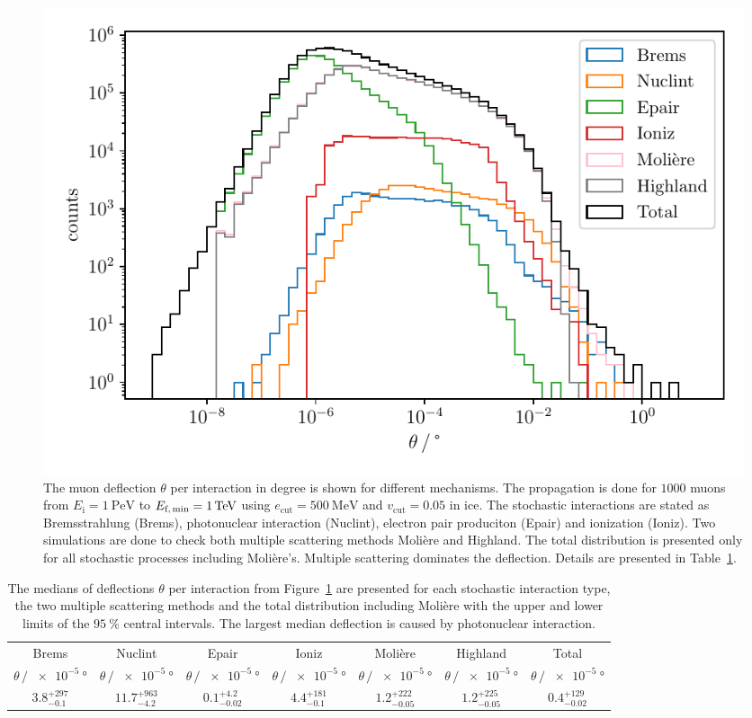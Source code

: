 \begin{figure}
    \centering 
    \includegraphics{../../deflection/plots/FINAL/1PeV_1TeV_1000events_deflection_along_sampling.pdf}
    \caption{The muon deflection $\theta$ per interaction in degree is shown for different mechanisms. The propagation is done for $\num{1000}$ 
    muons from $E_{\text{i}} = \SI{1}{\peta\electronvolt}$ to $E_{\text{f,\,min}} = \SI{1}{\tera\electronvolt}$ using $e_{\mathrm{cut}} = \SI{500}{\mega\electronvolt}$ and $v_{\mathrm{cut}} = 0.05$ in ice. 
    The stochastic interactions 
    are stated as Bremsstrahlung (Brems), photonuclear interaction (Nuclint), electron pair produciton (Epair) and ionization (Ioniz).
    Two simulations 
    are done to check both multiple scattering methods Molière and Highland.  
    The total distribution is presented only for all stochastic processes including Molière's. Multiple scattering dominates the deflection. Details are presented in 
    Table~\ref{tab:defl_per_int}.}
    \label{fig:defl_per_int}
\end{figure}

\begin{table}
    \centering 
    \caption{The medians of deflections $\theta$ per interaction from Figure~\ref{fig:defl_per_int} are presented for each stochastic interaction type, the two multiple scattering methods and the total distribution including Molière with the upper and lower limits of the $\SI{95}{\percent}$ 
    central intervals. The largest median deflection is caused by photonuclear interaction.}
    \begin{tabular}{ccccccc}
        \toprule 
        Brems & Nuclint & Epair & Ioniz & Molière & Highland & Total  \vspace{6pt} \\
        $\theta\,/\,\SI{e-5}{\degree}$ & $\theta\,/\,\SI{e-5}{\degree}$ & $\theta\,/\,\SI{e-5}{\degree}$ & $\theta\,/\,\SI{e-5}{\degree}$ & $\theta\,/\,\SI{e-5}{\degree}$ & $\theta\,/\,\SI{e-5}{\degree}$ & $\theta\,/\,\SI{e-5}{\degree}$\\
        \midrule 
        $3.8_{-0.1}^{+297}$ & $11.7_{-4.2}^{+963}$ & $0.1_{-0.02}^{+4.2}$ & $4.4_{-0.1}^{+181}$& $1.2_{-0.05}^{+222}$ & $1.2_{-0.05}^{+225}$ & $0.4_{-0.02}^{+129}$\\ 
        \bottomrule
    \end{tabular}
    \label{tab:defl_per_int}
\end{table}

